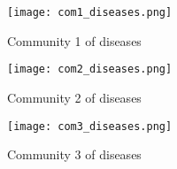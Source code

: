 \begin{figure}[H]
    \centering
    \texttt{[image: com1\_diseases.png]}
    \caption{Community 1 of diseases}
    \label{fig:com1_diseases}
\end{figure}

\begin{figure}[H]
    \centering
    \texttt{[image: com2\_diseases.png]}
    \caption{Community 2 of diseases}
    \label{fig:com2_diseases}
\end{figure}

\begin{figure}[H]
    \centering
    \texttt{[image: com3\_diseases.png]}
    \caption{Community 3 of diseases}
    \label{fig:com3_diseases}
\end{figure}





